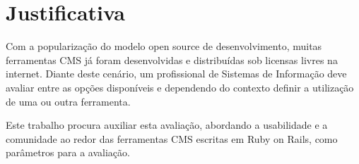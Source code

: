\section{Justificativa}
 
Com a popularização do modelo open source de desenvolvimento, muitas ferramentas CMS já foram desenvolvidas e distribuídas sob licensas livres na internet. Diante deste cenário, um profissional de Sistemas de Informação deve avaliar entre as opções disponíveis e dependendo do contexto definir a utilização de uma ou outra ferramenta.

Este trabalho procura auxiliar esta avaliação, abordando a usabilidade e a comunidade ao redor das ferramentas CMS escritas em Ruby on Rails, como parâmetros para a avaliação. 




    
